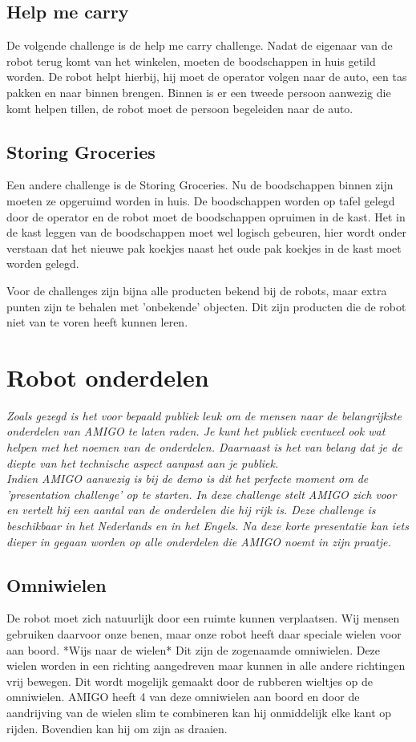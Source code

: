 \documentclass[a4paper,10pt]{article}
\numberwithin{equation}{section}
\numberwithin{figure}{section}
\numberwithin{table}{section}
\begin{document}
\subsection*{Help me carry}
De volgende challenge is de help me carry challenge. Nadat de eigenaar van de robot terug komt van het winkelen, moeten de boodschappen in huis getild worden. De robot helpt hierbij, hij moet de operator volgen naar de auto, een tas pakken en naar binnen brengen. Binnen is er een tweede persoon aanwezig die komt helpen tillen, de robot moet de persoon begeleiden naar de auto.

\subsection*{Storing Groceries}
Een andere challenge is de Storing Groceries. Nu de boodschappen binnen zijn moeten ze opgeruimd worden in huis. De boodschappen worden op tafel gelegd door de operator en de robot moet de boodschappen opruimen in de kast. Het in de kast leggen van de boodschappen moet wel logisch gebeuren, hier wordt onder verstaan dat het nieuwe pak koekjes naast het oude pak koekjes in de kast moet worden gelegd.\

Voor de challenges zijn bijna alle producten bekend bij de robots, maar extra punten zijn te behalen met 'onbekende' objecten. Dit zijn producten die de robot niet van te voren heeft kunnen leren.

\section*{Robot onderdelen}
\textit{Zoals gezegd is het voor bepaald publiek leuk om de mensen naar de belangrijkste onderdelen van AMIGO te laten raden. Je kunt het publiek eventueel ook wat helpen met het noemen van de onderdelen. Daarnaast is het van belang dat je de diepte van het technische aspect aanpast aan je publiek.}\\

\textit{Indien AMIGO aanwezig is bij de demo is dit het perfecte moment om de 'presentation challenge' op te starten. In deze challenge stelt AMIGO zich voor en vertelt hij een aantal van de onderdelen die hij rijk is. Deze challenge is beschikbaar in het Nederlands en in het Engels. Na deze korte presentatie kan iets dieper in gegaan worden op alle onderdelen die AMIGO noemt in zijn praatje.}\\

\subsection*{Omniwielen}
De robot moet zich natuurlijk door een ruimte kunnen verplaatsen. Wij mensen gebruiken daarvoor onze benen, maar onze robot heeft daar speciale wielen voor aan boord. *Wijs naar de wielen* Dit zijn de zogenaamde omniwielen. Deze wielen worden in een richting aangedreven maar kunnen in alle andere richtingen vrij bewegen. Dit wordt mogelijk gemaakt door de rubberen wieltjes op de omniwielen. AMIGO heeft 4 van deze omniwielen aan boord en door de aandrijving van de wielen slim te combineren kan hij onmiddelijk elke kant op rijden. Bovendien kan hij om zijn as draaien. \\
\end{document}
